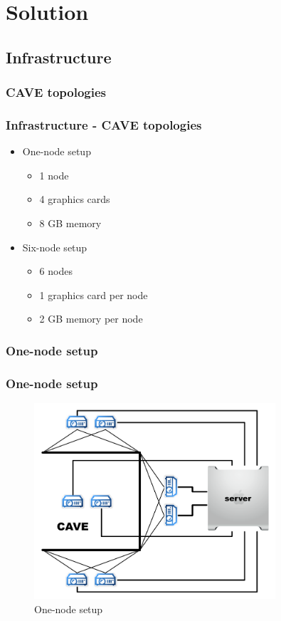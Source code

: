 \section{Solution}

\subsection{Infrastructure}
\subsubsection*{CAVE topologies}
\begin{frame}\frametitle{Infrastructure - CAVE topologies}
	\begin{itemize}
		\item<1-> One-node setup
		\begin{itemize}
			\item 1 node
			\item 4 graphics cards
			\item 8 GB memory
		\end{itemize}
		\item<2-> Six-node setup
		\begin{itemize}
			\item 6 nodes
			\item 1 graphics card per node
			\item 2 GB memory per node
		\end{itemize}
	\end{itemize}
\end{frame}

\subsubsection*{One-node setup}
\begin{frame}\frametitle{One-node setup}
	\begin{figure}
		\centering
	\includegraphics[width=0.8\textwidth]{../figures/1node_architecture}
	\caption{One-node setup}
	\end{figure}
\end{frame}

